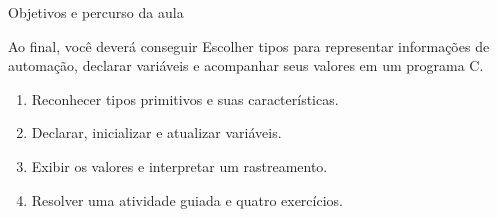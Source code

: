 \begin{frame}{Objetivos e percurso da aula}
\begin{block}{Ao final, você deverá conseguir}
Escolher tipos para representar informações de automação, declarar variáveis e acompanhar seus valores em um programa C.
\end{block}
\begin{enumerate}
\item Reconhecer tipos primitivos e suas características.
\item Declarar, inicializar e atualizar variáveis.
\item Exibir os valores e interpretar um rastreamento.
\item Resolver uma atividade guiada e quatro exercícios.
\end{enumerate}
\end{frame}
